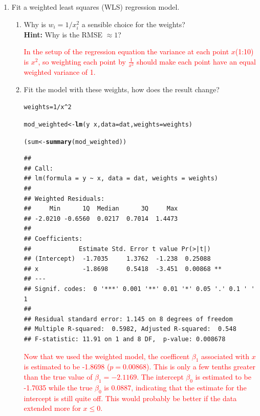 \documentclass{article}\usepackage[]{graphicx}\usepackage[]{xcolor}
\makeatletter
\newcommand{\hlnum}[1]{\textcolor[rgb]{0.686,0.059,0.569}{#1}}%
\newcommand{\hlopt}[1]{\textcolor[rgb]{0,0,0}{#1}}%
\newcommand{\hldef}[1]{\textcolor[rgb]{0.345,0.345,0.345}{#1}}%
\newcommand{\hlkwb}[1]{\textcolor[rgb]{0.69,0.353,0.396}{#1}}%
\newcommand{\hlkwc}[1]{\textcolor[rgb]{0.333,0.667,0.333}{#1}}%
\newcommand{\hlkwd}[1]{\textcolor[rgb]{0.737,0.353,0.396}{\textbf{#1}}}%
\newenvironment{kframe}{%
 \def\at@end@of@kframe{}%
 \ifinner\ifhmode%
  \def\at@end@of@kframe{\end{minipage}}%
  \begin{minipage}{\columnwidth}%
 \fi\fi%
 \def\FrameCommand##1{\hskip\@totalleftmargin \hskip-\fboxsep
 \colorbox{shadecolor}{##1}\hskip-\fboxsep
     \hskip-\linewidth \hskip-\@totalleftmargin \hskip\columnwidth}%
 \MakeFramed {\advance\hsize-\width
   \@totalleftmargin\z@ \linewidth\hsize
   \@setminipage}}%
 {\par\unskip\endMakeFramed%
 \at@end@of@kframe}
\newenvironment{knitrout}{}{} %
\makeatother
\begin{document}
\begin{enumerate}
\begin{enumerate}
  \item Fit a weighted least squares (WLS) regression model.
  \begin{enumerate}
    \item Why is $w_i = 1/x_i^2$ a sensible choice for the weights?\\
    \textbf{Hint:} Why is the RMSE $\approx 1$?

\textcolor{red}{In the setup of the regression equation the variance at each point $x$(1:10) is $x^2$, so weighting each point by $\frac{1}{x^2}$ should make each point have an equal weighted variance of 1.}

    
    \item Fit the model with these weights, how does the result change?
    
\begin{knitrout}\scriptsize
{}\color{fgcolor}\begin{kframe}
\begin{alltt}
\hldef{weights} \hlkwb{=} \hlnum{1}\hlopt{/}\hldef{x}\hlopt{^}\hlnum{2}

\hldef{mod_weighted} \hlkwb{<-} \hlkwd{lm}\hldef{(y} \hlopt{~} \hldef{x,} \hlkwc{data} \hldef{= dat,} \hlkwc{weights} \hldef{= weights)}

\hldef{(sum} \hlkwb{<-} \hlkwd{summary}\hldef{(mod_weighted))}
\end{alltt}
\begin{verbatim}
## 
## Call:
## lm(formula = y ~ x, data = dat, weights = weights)
## 
## Weighted Residuals:
##     Min      1Q  Median      3Q     Max 
## -2.0210 -0.6560  0.0217  0.7014  1.4473 
## 
## Coefficients:
##             Estimate Std. Error t value Pr(>|t|)   
## (Intercept)  -1.7035     1.3762  -1.238  0.25088   
## x            -1.8698     0.5418  -3.451  0.00868 **
## ---
## Signif. codes:  0 '***' 0.001 '**' 0.01 '*' 0.05 '.' 0.1 ' ' 1
## 
## Residual standard error: 1.145 on 8 degrees of freedom
## Multiple R-squared:  0.5982,	Adjusted R-squared:  0.548 
## F-statistic: 11.91 on 1 and 8 DF,  p-value: 0.008678
\end{verbatim}
\end{kframe}
\end{knitrout}
 
 \textcolor{red}{Now that we used the weighted model, the coefficent $\beta_1$ associated with $x$ is estimated to be -1.8698 ($p = 0.00868$). This is only a few tenths greater than the true value of $\beta_1 = -2.1169$. The intercept $\beta_0$ is estimated to be -1.7035 while the true $\beta_0$ is 0.0887, indicating that the estimate for the intercept is still quite off. This would probably be better if the data extended more for $x \leq 0$.}
    

\end{enumerate}
\end{enumerate}
\end{enumerate}
\end{document}
